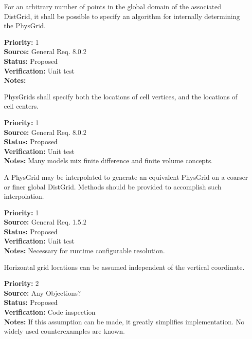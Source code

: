 
For an arbitrary number of points in the global domain of the associated
DistGrid, it shall be possible to specify an algorithm for internally
determining the PhysGrid.
\begin{reqlist}
{\bf Priority:} 1 \\
{\bf Source:} General Req. 8.0.2 \\
{\bf Status:} Proposed \\
{\bf Verification:} Unit test\\
{\bf Notes:} 
\end{reqlist}


PhysGrids shall specify both the locations of cell vertices, and the locations
of cell centers.
\begin{reqlist}
{\bf Priority:} 1 \\
{\bf Source:} General Req. 8.0.2 \\
{\bf Status:} Proposed \\
{\bf Verification:} Unit test\\
{\bf Notes:} Many models mix finite difference and finite volume concepts.
\end{reqlist}


A PhysGrid may be interpolated to generate an equivalent PhysGrid on a coarser
or finer global DistGrid.  Methods should be provided to accomplish such
interpolation.
\begin{reqlist}
{\bf Priority:} 1 \\
{\bf Source:} General Req. 1.5.2 \\
{\bf Status:} Proposed \\
{\bf Verification:} Unit test\\
{\bf Notes:} Necessary for runtime configurable resolution.
\end{reqlist}

Horizontal grid locations can be assumed independent of the vertical coordinate.
\begin{reqlist}
{\bf Priority:} 2 \\
{\bf Source:} Any Objections? \\
{\bf Status:} Proposed \\
{\bf Verification:} Code inspection\\
{\bf Notes:} If this assumption can be made, it greatly simplifies implementation.
No widely used counterexamples are known.
\end{reqlist}

